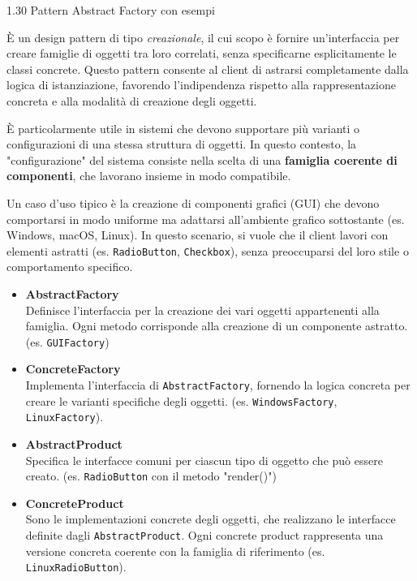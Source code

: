 \begin{problem}{1.30}
Pattern Abstract Factory con esempi
\end{problem}
\begin{solution}
È un design pattern di tipo \textit{creazionale}, il cui scopo è fornire un’interfaccia per creare famiglie di oggetti tra loro 
correlati, senza specificarne esplicitamente le classi concrete. Questo pattern consente al client di astrarsi completamente 
dalla logica di istanziazione, favorendo l’indipendenza rispetto alla rappresentazione concreta e alla modalità di creazione degli
oggetti.
\newline

È particolarmente utile in sistemi che devono supportare più varianti o configurazioni di una stessa struttura di oggetti. 
In questo contesto, la "configurazione" del sistema consiste nella scelta di una \textbf{famiglia coerente di componenti}, 
che lavorano insieme in modo compatibile.
\newline

Un caso d’uso tipico è la creazione di componenti grafici (GUI) che devono comportarsi in modo uniforme ma adattarsi all’ambiente 
grafico sottostante (es. Windows, macOS, Linux). In questo scenario, si vuole che il client lavori con elementi astratti (es. \texttt{RadioButton}, \texttt{Checkbox}), 
senza preoccuparsi del loro stile o comportamento specifico.

\begin{itemize}
	\item \textbf{AbstractFactory} \\
	Definisce l’interfaccia per la creazione dei vari oggetti appartenenti alla famiglia. 
	Ogni metodo corrisponde alla creazione di un componente astratto. (es. \texttt{GUIFactory})

	\item \textbf{ConcreteFactory} \\
	Implementa l’interfaccia di \texttt{AbstractFactory}, fornendo la logica concreta per creare le varianti specifiche degli oggetti.
	(es. \texttt{WindowsFactory}, \texttt{LinuxFactory}).

	\item \textbf{AbstractProduct} \\
	Specifica le interfacce comuni per ciascun tipo di oggetto che può essere creato. (es. \texttt{RadioButton} con il metodo "render()")

	\item \textbf{ConcreteProduct} \\
	Sono le implementazioni concrete degli oggetti, che realizzano le interfacce definite dagli \texttt{AbstractProduct}. 
	Ogni concrete product rappresenta una versione concreta coerente con la famiglia di riferimento (es. \texttt{LinuxRadioButton}).


\end{itemize}
\end{solution}
